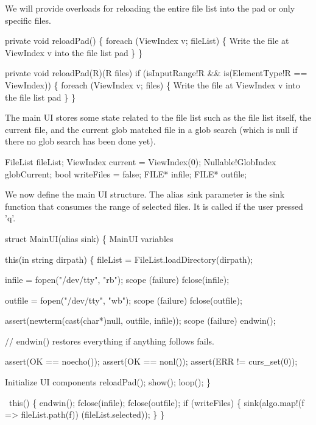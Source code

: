 \nwendcode{}We will provide overloads for reloading the entire file list into
the pad or only specific files.

\nwenddocs{}\endmoddef\nwstartdeflinemarkup\nwenddeflinemarkup
private void reloadPad()
\{
  foreach (ViewIndex v; fileList) \{
    \LA{}Write the file at ViewIndex v into the file list pad\RA{}
  \}
\}

private void reloadPad(R)(R files)
  if (isInputRange!R && is(ElementType!R == ViewIndex))
\{
  foreach (ViewIndex v; files) \{
    \LA{}Write the file at ViewIndex v into the file list pad\RA{}
  \}
\}

\nwendcode{}The main UI stores some state related to the file list such as the
file list itself, the current file, and the current glob matched file
in a glob search (which is null if there no glob search has been done
yet).

\nwenddocs{}\plusendmoddef\nwstartdeflinemarkup\nwenddeflinemarkup
FileList fileList;
ViewIndex current = ViewIndex(0);
Nullable!GlobIndex globCurrent;
bool writeFiles = false;
FILE* infile;
FILE* outfile;

\nwendcode{}We now define the main UI structure. The {\Tt{}alias\ sink\nwendquote} parameter is
the sink function that consumes the range of selected files. It is
called if the user pressed 'q'.

\nwenddocs{}\endmoddef\nwstartdeflinemarkup\nwenddeflinemarkup
struct MainUI(alias sink)
\{
  \LA{}MainUI variables\RA{}
  
  this(in string dirpath) \{
    fileList = FileList.loadDirectory(dirpath);
    
    infile  = fopen("/dev/tty", "rb");
    scope (failure) fclose(infile);
    
    outfile = fopen("/dev/tty", "wb");
    scope (failure) fclose(outfile);
    
    assert(newterm(cast(char*)null, outfile, infile));
    scope (failure) endwin();
    
    // endwin() restores everything if anything follows fails.
    
    assert(OK == noecho());
    assert(OK == nonl());
    assert(ERR != curs_set(0));
    
    \LA{}Initialize UI components\RA{}
    reloadPad();
    show();
    loop();
  \}

  ~this() \{
    endwin();
    fclose(infile);
    fclose(outfile);
    if (writeFiles) \{
        sink(algo.map!(f => fileList.path(f))
                      (fileList.selected));
    \}
  \}
  
